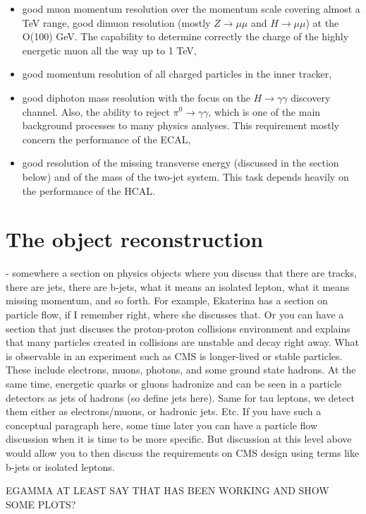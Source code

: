 \begin{normalsize}
\begin{itemize}
\item good muon momentum resolution over the momentum scale covering almost a TeV range, good dimuon resolution (mostly $Z \rightarrow \mu \mu$ and $H \rightarrow \mu \mu$) at the O(100) GeV. The capability to determine correctly the charge of the highly energetic muon all the way up to 1 TeV,
\item good momentum resolution of all charged particles in the inner tracker,
\item good diphoton mass resolution with the focus on the $H \rightarrow \gamma \gamma$ discovery channel. Also, the ability to reject $\pi^0 \rightarrow \gamma \gamma$, which is one of the main background processes to many physics analyses.  This requirement mostly concern the performance of the ECAL,
\item good resolution of the missing transverse energy (discussed in the section below) and of the mass of the two-jet system. This task depends heavily on the performance of the HCAL.
\end{itemize}



\section{The object reconstruction}\label{sec:cms_reconstruction}

  
  - somewhere a section on physics objects where you discuss that there are tracks, there are jets, there are b-jets, what it means an isolated lepton, what it means missing momentum, and so forth. For example, Ekaterina has a section on particle flow, if I remember right, where she discusses that. Or you can have a section that just discuses the proton-proton collisions environment and explains that many particles created in collisions are unstable and decay right away. What is observable in an experiment such as CMS is longer-lived or stable particles. These include electrons, muons, photons, and some ground state hadrons. At the same time, energetic quarks or gluons hadronize and can be seen in a particle detectors as jets of hadrons (so define jets here). Same for tau leptons, we detect them either as electrons/muons, or hadronic jets. Etc. If you have such a conceptual paragraph here, some time later you can have a particle flow discussion when it is time to be more specific. But discussion at this level above would allow you to then discuss the requirements on CMS design using terms like b-jets or isolated leptons.

  EGAMMA AT LEAST SAY THAT HAS BEEN WORKING AND SHOW SOME PLOTS?

\end{normalsize}       %
 
